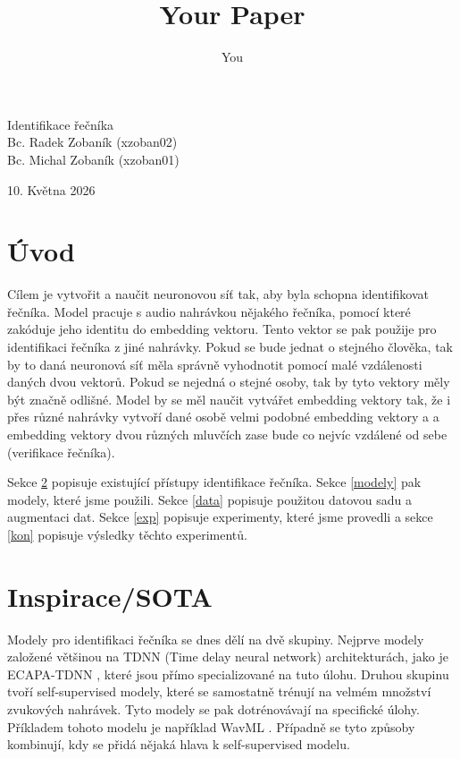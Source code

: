 \documentclass{article}
\title{Your Paper}
\author{You}
\begin{document}
\thispagestyle{empty}%
\vspace*{\fill}
\begin{center}
    {\fontsize{100pt}{14pt}\selectfont Identifikace řečníka }\\[1em]
    {Bc. Radek Zobaník}
    {(xzoban02)} \\
    {Bc. Michal Zobaník}
    {(xzoban01)}
\end{center}
\vspace*{\fill}
\hfill 10. Května 2026
\newpage

\tableofcontents

\newpage

\section{Úvod} 

Cílem je vytvořit a naučit neuronovou síť tak, aby byla schopna identifikovat řečníka. Model pracuje s audio nahrávkou nějakého řečníka, pomocí které zakóduje jeho identitu do embedding vektoru. Tento vektor se pak použije pro identifikaci řečníka z jiné nahrávky. Pokud se bude jednat o stejného člověka, tak by to daná neuronová síť měla správně vyhodnotit pomocí malé vzdálenosti daných dvou vektorů. Pokud se nejedná o stejné osoby, tak by tyto vektory měly být značně odlišné. Model by se měl naučit vytvářet embedding vektory tak, že i přes různé nahrávky vytvoří dané osobě velmi podobné embedding vektory a a embedding vektory dvou různých mluvčích zase bude co nejvíc vzdálené od sebe (verifikace řečníka).

Sekce \ref{SOTA} popisuje existující přístupy identifikace řečníka. Sekce \ref{modely} pak modely, které jsme použili. Sekce \ref{data} popisuje použitou datovou sadu a augmentaci dat. Sekce \ref{exp} popisuje experimenty, které jsme provedli a sekce \ref{kon} popisuje výsledky těchto experimentů.


\section{Inspirace/SOTA} \label{SOTA}

Modely pro identifikaci řečníka se dnes dělí na dvě skupiny.
Nejprve modely založené většinou na TDNN (Time delay neural network) architekturách, jako je 
ECAPA-TDNN \cite{ECAPA}, které jsou přímo specializované na tuto úlohu. Druhou skupinu tvoří self-supervised modely, které se samostatně trénují na velmém množství zvukových nahrávek. Tyto modely se pak dotrénovávají na specifické úlohy. Příkladem tohoto modelu je například WavML \cite{WavLM}. Případně se tyto způsoby kombinují, kdy se přidá nějaká hlava k self-supervised modelu.
\end{document}
